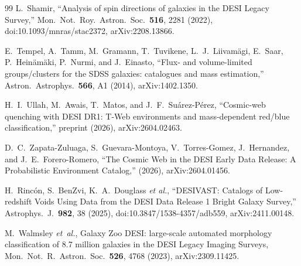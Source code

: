 \documentclass[aps,prd,twocolumn,superscriptaddress,showpacs,preprintnumbers,nofootinbib,longbibliography,floatfix]{revtex4-2}
\begin{document}
\begin{thebibliography}{99}
L.~Shamir,
``Analysis of spin directions of galaxies in the DESI Legacy
Survey,''
Mon.\ Not.\ Roy.\ Astron.\ Soc.\ \textbf{516}, 2281 (2022),
doi:10.1093/mnras/stac2372, arXiv:2208.13866.

E.~Tempel, A.~Tamm, M.~Gramann, T.~Tuvikene, L.~J.~Liivam\"agi,
E.~Saar, P.~Hein\"am\"aki, P.~Nurmi, and J.~Einasto,
``Flux- and volume-limited groups/clusters for the SDSS galaxies:
catalogues and mass estimation,'' Astron.\ Astrophys.\ \textbf{566},
A1 (2014), arXiv:1402.1350.

H.~I.~Ullah, M.~Awais, T.~Matos, and J.~F.~Su\'arez-P\'erez,
``Cosmic-web quenching with DESI DR1: T-Web environments and
mass-dependent red/blue classification,''
preprint (2026), arXiv:2604.02463.

D.~C.~Zapata-Zuluaga, S.~Guevara-Montoya, V.~Torres-Gomez,
J.~Hernandez, and J.~E.~Forero-Romero, ``The Cosmic Web in the DESI
Early Data Release: A Probabilistic Environment Catalog,'' (2026),
arXiv:2604.01456.

H.~Rinc\'on, S.~BenZvi, K.~A.~Douglass \textit{et al.},
``DESIVAST: Catalogs of Low-redshift Voids Using Data from the DESI
Data Release 1 Bright Galaxy Survey,'' Astrophys.\ J.\ \textbf{982},
38 (2025), doi:10.3847/1538-4357/adb559, arXiv:2411.00148.

M.~Walmsley \emph{et~al.}, Galaxy Zoo DESI: large-scale automated
morphology classification of 8.7 million galaxies in the DESI Legacy
Imaging Surveys, Mon.\ Not.\ R.\ Astron.\ Soc.\ \textbf{526}, 4768 (2023),
arXiv:2309.11425.

\end{thebibliography}
\end{document}
